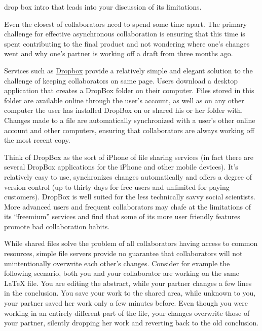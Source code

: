 \documentclass[]{article}
\begin{document}
drop box intro that leads into your discussion of its limitations.

Even the closest of collaborators need to spend some time apart. The primary
challenge for effective asynchronous collaboration is ensuring that this time 
is spent contributing to the final product and not wondering where one's 
changes went and why one's partner is working off a draft from three months ago.

Services such as \href{http://www.dropbox.com}{Dropbox} provide a relatively 
simple and elegant solution to the challenge of keeping collaborators on same 
page. Users download a desktop application that creates a DropBox folder on
their computer. Files stored in this folder are available online through the 
user's account, as well as on any other computer the user has installed DropBox 
on or shared his or her folder with. Changes made to a file are automatically
synchronized with a user's other online account and other computers, ensuring 
that
collaborators are always working off the most recent copy.

Think of DropBox as the sort of iPhone of file sharing services (in fact there
are several DropBox applications for the iPhone and other mobile devices). It's 
relatively easy to use, synchronizes changes automatically and offers a 
degree 
of version control (up to thirty days for free users and unlimited for paying 
customers). DropBox is well suited for the less technically savvy social 
scientists. More advanced users and frequent collaborators may chafe at the 
limitations of its ``freemium'' services and find that some of its more user
friendly features promote bad collaboration habits.

While shared files solve the problem of all collaborators having
access to common resources, simple file servers provide no guarantee that
collaborators will not unintentionally overwrite each other's changes. Consider
for example the following scenario, both you and your collaborator are working
on the same LaTeX file. You are editing the abstract, while your partner
changes a few lines in the conclusion. You save your work to the shared area,
while unknown to you, your partner saved her work only a few minutes before.
Even though you were working in an entirely different part of the file, your
changes overwrite those of your partner, silently dropping her work and
reverting back to the old conclusion. 
\end{document}

